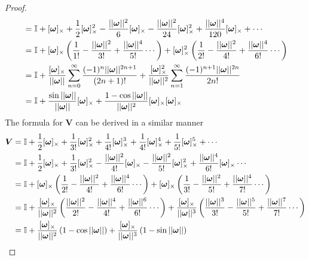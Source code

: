 \begin{proof}
\begin{subequations}
\begin{align*}
       &= \mathbb{I} + [\bm{\omega}]_{\times} + \frac{1}{2}[\bm{\omega}]_{\times}^2 -\frac{||\bm{\omega}||^2}{6}[\bm{\omega}]_{\times} - \frac{||\bm{\omega}||^2}{24}[\bm{\omega}]_{\times}^2 + \frac{||\bm{\omega}||^4}{120}[\bm{\omega}]_{\times} + \cdots \\
       &= \mathbb{I} + [\bm{\omega}]_{\times}\left(\frac{1}{1!} - \frac{||\bm{\omega}||^2}{3!} + \frac{||\bm{\omega}||^4}{5!} \cdots\right)
       + [\bm{\omega}]_{\times}^2\left(\frac{1}{2!} - \frac{||\bm{\omega}||^2}{4!} + \frac{||\bm{\omega}||^4}{6!} \cdots\right)\\
       &= \mathbb{I} + \frac{[\bm{\omega}]_{\times}}{||\bm{\omega}||}\sum_{n=0}^{\infty}\frac{(-1)^{n}||\bm{\omega}||^{2n+1}}{(2n+1)!}
       + \frac{[\bm{\omega}]_{\times}^2}{||\bm{\omega}||^2}\sum_{n=1}^{\infty}\frac{(-1)^{n+1}||\bm{\omega}||^{2n}}{2n!} \\
    &= \mathbb{I}
    + \frac{\sin{||\bm{\omega}||}}{||\bm{\omega}||}[\bm{\omega}]_{\times}
    + \frac{1-\cos{||\bm{\omega}||}}{||\bm{\omega}||^2}
       [\bm{\omega}]_{\times}[\bm{\omega}]_{\times}
\end{align*}
\end{subequations} 
The formula for \(\bm{V}\) can be derived in a similar manner
\begin{subequations}
\begin{align*}
\bm{V} &= \mathbb{I} + \frac{1}{2}[ \bm{\omega} ]_{\times}+ \frac{1}{3!}[ \bm{\omega} ]_{\times}^2 + \frac{1}{4!}[ \bm{\omega} ]_{\times}^3 + \frac{1}{4!}[ \bm{\omega} ]_{\times}^4 + \frac{1}{5!}[ \bm{\omega} ]_{\times}^5 + \cdots \\
    &= \mathbb{I} + \frac{1}{2}[ \bm{\omega} ]_{\times}+ \frac{1}{3!}[ \bm{\omega} ]_{\times}^2 - \frac{||\bm{\omega}||^2}{4!}[ \bm{\omega} ]_{\times} - \frac{||\bm{\omega}||^2}{5!}[ \bm{\omega} ]_{\times}^2 + \frac{||\bm{\omega}||^4}{6!}[ \bm{\omega} ]_{\times} \cdots \\
&= \mathbb{I} + [ \bm{\omega} ]_{\times}\left(\frac{1}{2!} - \frac{||\bm{\omega}||^2}{4!} + \frac{||\bm{\omega}||^4}{6!} \cdots\right)
+ [ \bm{\omega} ]_{\times}\left(\frac{1}{3!} - \frac{||\bm{\omega}||^2}{5!} + \frac{||\bm{\omega}||^4}{7!}\cdots\right)\\
&= \mathbb{I} + \frac{[ \bm{\omega} ]_{\times}}{||\bm{\omega}||^2}\left(\frac{||\bm{\omega}||^2}{2!} - \frac{||\bm{\omega}||^4}{4!} + \frac{||\bm{\omega}||^6}{6!} \cdots\right)
+ \frac{[ \bm{\omega} ]_{\times}}{||\bm{\omega}||^3}\left(\frac{||\bm{\omega}||^3}{3!} - \frac{||\bm{\omega}||^5}{5!} + \frac{||\bm{\omega}||^7}{7!}\cdots\right) \\
&= \mathbb{I} + \frac{[ \bm{\omega} ]_{\times}}{||\bm{\omega}||^2}\left(1 - \cos{||\bm{\omega}||}\right)
+ \frac{[ \bm{\omega} ]_{\times}}{||\bm{\omega}||^3}\left(1-\sin{||\bm{\omega}||}\right)
\end{align*}
\end{subequations}
\end{proof}

